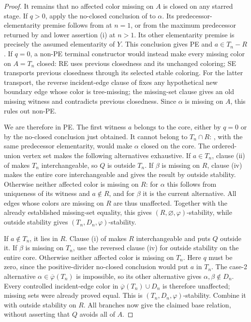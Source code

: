 \begin{proof}
It remains that no affected color missing on $A$ is closed on any starred
stage.  If $q>0$, apply the no-closed conclusion of 
to $\alpha$.  Its predecessor-elementarity premise follows from
 at $n=1$, or from the maximum predecessor
returned by  and lower assertion (i)
at $n>1$.  Its other elementarity premise is precisely the assumed
elementarity of $Y$.  This conclusion gives PE and
$a\in T_n-R$.  If $q=0$, a non-PE terminal constructor would instead
make every missing color on $A=T_n$ closed: RE uses previous closedness
and its unchanged coloring; SE transports previous closedness through its
selected stable coloring.  For the latter transport, the reverse
incident-edge clause of  fixes any hypothetical new boundary
edge whose color is tree-missing; the missing-set clause gives an old
missing witness and contradicts previous closedness.  Since $\alpha$
is missing on $A$, this rules out non-PE.

We are therefore in PE.  The first witness $a$ belongs to the core, either
by $q=0$ or by the no-closed conclusion just obtained.  It cannot belong
to $T_n\cap R$: , with the same
predecessor elementarity, would make $\alpha$ closed on the core.
The ordered-union vertex set makes the following alternatives exhaustive.
If $a\in T_n$, clause (ii) of  makes $T_n$
interchangeable, so $Q$ is outside $T_n$.  If $\beta$ is missing on $R$,
clause (iv) makes the entire core interchangeable and gives the result
by outside stability.  Otherwise neither affected color is missing on
$R$: for $\alpha$ this follows from uniqueness of its witness and
$a\notin R$, and for $\beta$ it is the current alternative.
All edges whose colors are missing on $R$ are thus unaffected.
Together with the already established missing-set equality, this gives
$(R,\varnothing,\varphi)$-stability, while outside stability gives
$(T_n,D_n,\varphi)$-stability.

If $a\notin T_n$, it lies in $R$.  Clause (i) of
 makes $R$ interchangeable and puts $Q$ outside it.
If $\beta$ is missing on $T_n$, use the reversed clause (iv) for outside
stability on the entire core.  Otherwise neither affected color is
missing on $T_n$.  Here $q$ must be zero, since the positive-divider
no-closed conclusion would put $a$ in $T_n$.  The case-2 alternative
$\alpha\in\overline\varphi(T_n)$ is impossible, so its other alternative
gives $\alpha,\beta\notin D_n$.  Every controlled incident-edge color in
$\overline\varphi(T_n)\cup D_n$ is therefore unaffected; missing sets were
already proved equal.  This is $(T_n,D_n,\varphi)$-stability.
Combine it with outside stability on $R$.  All branches now give the
claimed base relation, without asserting that $Q$ avoids all of $A$.
\end{proof}

